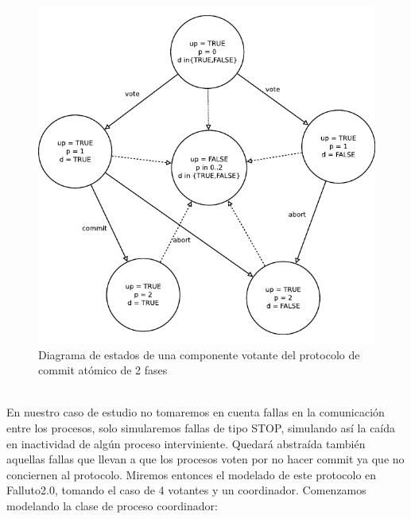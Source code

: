 \documentclass[titlepage, 12pt]{book}
\begin{document}
\begin{figure}[H]
  \centering
    \includegraphics[scale=0.75]{Imagenes/2pcVoter.pdf}
  \caption{Diagrama de estados de una componente votante del protocolo de commit atómico de 2 fases}
  \label{2pcv}
\end{figure}
~\\

En nuestro caso de estudio no tomaremos en cuenta fallas en la comunicación entre los procesos, solo simularemos fallas de tipo STOP, simulando así la caída en inactividad de algún proceso interviniente. Quedará abstraída también aquellas fallas que llevan a que los procesos voten por no hacer commit ya que no conciernen al protocolo. Miremos entonces el modelado de este protocolo en Falluto2.0, tomando el caso de 4 votantes y un coordinador. Comenzamos modelando la clase de proceso coordinador:\\
\end{document}
